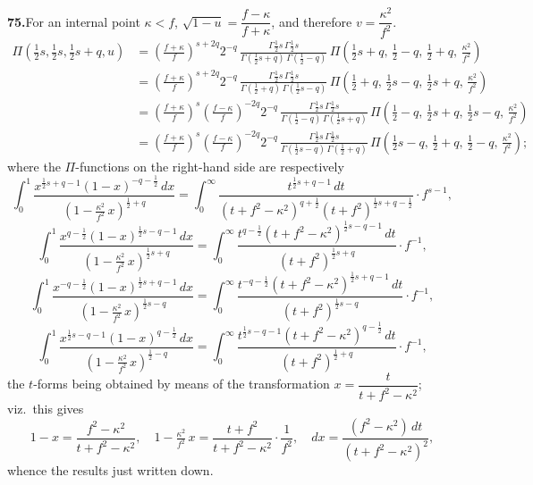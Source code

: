 \documentclass[11pt]{article}
\begin{document}
\bigskip

\noindent\textbf{75.}\quad For an internal point $\kappa<f$, $\sqrt{1-u} = \dfrac{f-\kappa}{f+\kappa}$, and therefore $v = \dfrac{\kappa^{2}}{f^{2}}$.
\begin{align*}
\Pi(\tfrac{1}{2}s,\tfrac{1}{2}s,\tfrac{1}{2}s+q,u)
&= \left(\frac{f+\kappa}{f}\right)^{s+2q} 2^{-q}\,\frac{\Gamma\tfrac{1}{2}s\,\Gamma\tfrac{1}{2}s}{\Gamma(\tfrac{1}{2}s+q)\,\Gamma(\tfrac{1}{2}-q)}\,\Pi\!\left(\tfrac{1}{2}s+q,\,\tfrac{1}{2}-q,\,\tfrac{1}{2}+q,\,\tfrac{\kappa^{2}}{f^{2}}\right) \\[4pt]
&= \left(\frac{f+\kappa}{f}\right)^{s+2q} 2^{-q}\,\frac{\Gamma\tfrac{1}{2}s\,\Gamma\tfrac{1}{2}s}{\Gamma(\tfrac{1}{2}+q)\,\Gamma(\tfrac{1}{2}s-q)}\,\Pi\!\left(\tfrac{1}{2}+q,\,\tfrac{1}{2}s-q,\,\tfrac{1}{2}s+q,\,\tfrac{\kappa^{2}}{f^{2}}\right) \\[4pt]
&= \left(\frac{f+\kappa}{f}\right)^{s}\left(\frac{f-\kappa}{f}\right)^{-2q} 2^{-q}\,\frac{\Gamma\tfrac{1}{2}s\,\Gamma\tfrac{1}{2}s}{\Gamma(\tfrac{1}{2}-q)\,\Gamma(\tfrac{1}{2}s+q)}\,\Pi\!\left(\tfrac{1}{2}-q,\,\tfrac{1}{2}s+q,\,\tfrac{1}{2}s-q,\,\tfrac{\kappa^{2}}{f^{2}}\right) \\[4pt]
&= \left(\frac{f+\kappa}{f}\right)^{s}\left(\frac{f-\kappa}{f}\right)^{-2q} 2^{-q}\,\frac{\Gamma\tfrac{1}{2}s\,\Gamma\tfrac{1}{2}s}{\Gamma(\tfrac{1}{2}s-q)\,\Gamma(\tfrac{1}{2}+q)}\,\Pi\!\left(\tfrac{1}{2}s-q,\,\tfrac{1}{2}+q,\,\tfrac{1}{2}-q,\,\tfrac{\kappa^{2}}{f^{2}}\right);
\end{align*}
where the $\Pi$-functions on the right-hand side are respectively
\[
\int_{0}^{1}\frac{x^{\frac{1}{2}s+q-1}(1-x)^{-q-\frac{1}{2}}\,dx}{(1-\tfrac{\kappa^{2}}{f^{2}}\,x)^{\frac{1}{2}+q}}
= \int_{0}^{\infty}\frac{t^{\frac{1}{2}s+q-1}\,dt}{(t+f^{2}-\kappa^{2})^{q+\frac{1}{2}}(t+f^{2})^{\frac{1}{2}s+q-\frac{1}{2}}}\cdot f^{s-1},
\]
\[
\int_{0}^{1}\frac{x^{q-\frac{1}{2}}(1-x)^{\frac{1}{2}s-q-1}\,dx}{(1-\tfrac{\kappa^{2}}{f^{2}}\,x)^{\frac{1}{2}s+q}}
= \int_{0}^{\infty}\frac{t^{q-\frac{1}{2}}(t+f^{2}-\kappa^{2})^{\frac{1}{2}s-q-1}\,dt}{(t+f^{2})^{\frac{1}{2}s+q}}\cdot f^{-1},
\]
\[
\int_{0}^{1}\frac{x^{-q-\frac{1}{2}}(1-x)^{\frac{1}{2}s+q-1}\,dx}{(1-\tfrac{\kappa^{2}}{f^{2}}\,x)^{\frac{1}{2}s-q}}
= \int_{0}^{\infty}\frac{t^{-q-\frac{1}{2}}(t+f^{2}-\kappa^{2})^{\frac{1}{2}s+q-1}\,dt}{(t+f^{2})^{\frac{1}{2}s-q}}\cdot f^{-1},
\]
\[
\int_{0}^{1}\frac{x^{\frac{1}{2}s-q-1}(1-x)^{q-\frac{1}{2}}\,dx}{(1-\tfrac{\kappa^{2}}{f^{2}}\,x)^{\frac{1}{2}-q}}
= \int_{0}^{\infty}\frac{t^{\frac{1}{2}s-q-1}(t+f^{2}-\kappa^{2})^{q-\frac{1}{2}}\,dt}{(t+f^{2})^{\frac{1}{2}+q}}\cdot f^{-1},
\]
the $t$-forms being obtained by means of the transformation $x = \dfrac{t}{t+f^{2}-\kappa^{2}}$; viz.\ this gives
\[
1 - x = \dfrac{f^{2}-\kappa^{2}}{t+f^{2}-\kappa^{2}},\quad
1 - \tfrac{\kappa^{2}}{f^{2}}\,x = \dfrac{t+f^{2}}{t+f^{2}-\kappa^{2}} \cdot \dfrac{1}{f^{2}},\quad
dx = \dfrac{(f^{2}-\kappa^{2})\,dt}{(t+f^{2}-\kappa^{2})^{2}},
\]
whence the results just written down.
\end{document}
